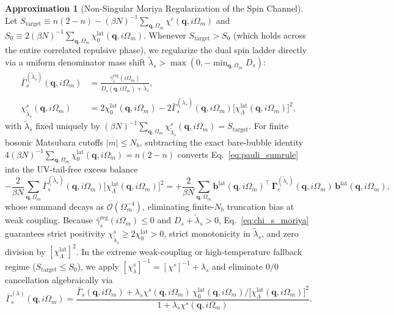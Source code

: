 \documentclass[11pt,a4paper]{article}
\numberwithin{equation}{section}
\theoremstyle{plain}
\theoremstyle{definition}
\newtheorem{approximation}{Approximation}[section]
\providecommand{\vq}{\mathbf{q}}
\begin{document}
\begin{approximation}[Non-Singular Moriya Regularization of the Spin Channel]
Let $S_{\mathrm{target}} \equiv n(2-n) - (\beta N)^{-1}\sum_{\vq,\Omega_m}\chi^c(\vq,i\Omega_m)$
and $S_0 \equiv 2(\beta N)^{-1}\sum_{\vq,\Omega_m}\chi_0^{\mathrm{lat}}(\vq,i\Omega_m)$.
Whenever $S_{\mathrm{target}} > S_0$ (which holds across the entire correlated repulsive
phase), we regularize the dual spin ladder directly via a uniform denominator mass shift
$\tilde{\lambda}_s > \max(0, -\min_{\vq,\Omega_m} D_s)$:
\begin{align}
    \bar{\Gamma}_s^{(\tilde{\lambda}_s)}(\vq,i\Omega_m)
    &= \frac{\bar{\gamma}_s^{\mathrm{reg}}(i\Omega_m)}{D_s(\vq,i\Omega_m) + \tilde{\lambda}_s},
    \label{eq:Gamma_s_moriya} \\
    \chi^s_{\tilde{\lambda}_s}(\vq,i\Omega_m)
    &= 2\chi_0^{\mathrm{lat}}(\vq,i\Omega_m)
       - 2\bar{\Gamma}_s^{(\tilde{\lambda}_s)}(\vq,i\Omega_m)
         \bigl[\chi_\Lambda^{\mathrm{lat}}(\vq,i\Omega_m)\bigr]^2,
    \label{eq:chi_s_moriya}
\end{align}
with $\tilde{\lambda}_s$ fixed uniquely by
$(\beta N)^{-1}\sum_{\vq,\Omega_m}\chi^s_{\tilde{\lambda}_s}(\vq,i\Omega_m) = S_{\mathrm{target}}$.
For finite bosonic Matsubara cutoffs $|m| \le N_b$, subtracting the exact bare-bubble
identity $4(\beta N)^{-1}\sum_{\vq,\Omega_m}\chi_0^{\mathrm{lat}}(\vq,i\Omega_m) = n(2-n)$
converts Eq.~\eqref{eq:pauli_sumrule} into the UV-tail-free excess balance
\begin{equation}
    -\frac{2}{\beta N}\sum_{\vq,\Omega_m}
        \bar{\Gamma}_s^{(\tilde{\lambda}_s)}(\vq,i\Omega_m)
        \bigl[\chi_\Lambda^{\mathrm{lat}}(\vq,i\Omega_m)\bigr]^2
    = +\frac{2}{\beta N}\sum_{\vq,\Omega_m}
        \mathbf{b}^{\mathrm{lat}}(\vq,i\Omega_m)^\top\,
        \mathbf{\Gamma}_c^{(\tilde{\lambda}_c)}(\vq,i\Omega_m)\,
        \mathbf{b}^{\mathrm{lat}}(\vq,i\Omega_m),
    \label{eq:pauli_excess}
\end{equation}
whose summand decays as $\mathcal{O}(\Omega_m^{-4})$, eliminating finite-$N_b$ truncation
bias at weak coupling. Because $\bar{\gamma}_s^{\mathrm{reg}}(i\Omega_m) \le 0$ and
$D_s + \tilde{\lambda}_s > 0$,
Eq.~\eqref{eq:chi_s_moriya} guarantees strict positivity
$\chi^s_{\tilde{\lambda}_s} \ge 2\chi_0^{\mathrm{lat}} > 0$, strict monotonicity in
$\tilde{\lambda}_s$, and zero division by $[\chi_\Lambda^{\mathrm{lat}}]^2$. In the
extreme weak-coupling or high-temperature fallback regime ($S_{\mathrm{target}} \le S_0$),
we apply $[\chi_\lambda^s]^{-1} = [\chi^s]^{-1} + \lambda_s$ and eliminate $0/0$
cancellation algebraically via
\begin{equation}
    \bar{\Gamma}_s^{(\lambda)}(\vq,i\Omega_m)
    = \frac{\bar{\Gamma}_s(\vq,i\Omega_m)
            + \lambda_s \chi^s(\vq,i\Omega_m)\, \chi_0^{\mathrm{lat}}(\vq,i\Omega_m)
              \big/\bigl[\chi_\Lambda^{\mathrm{lat}}(\vq,i\Omega_m)\bigr]^2}
           {1 + \lambda_s \chi^s(\vq,i\Omega_m)}.
    \label{eq:Gamma_s_fallback}
\end{equation}
\end{approximation}
\end{document}
